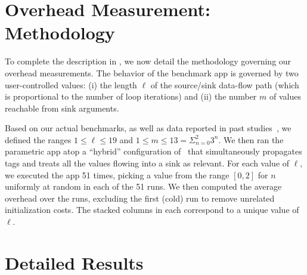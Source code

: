 \section{Overhead Measurement: Methodology}\label{Se:methodology}

To complete the description in , we now detail the methodology governing our overhead measurements.
The behavior of the benchmark app is governed by two user-controlled values: (i) the length $\ell$ of the source/sink data-flow path (which is proportional to the number of loop iterations) and (ii) the number $m$ of values reachable from sink arguments.

Based on our actual benchmarks, as well as data reported in past studies~\cite{TPFSW:PLDI09}, we defined the ranges $1 \leq \ell \leq 19$ and $1 \leq m \leq 13 = \Sigma_{n=0}^{2} 3^n$. We then ran the parametric app atop a ``hybrid'' configuration of \Tool\ that simultaneously propagates tags and treats all the values flowing into a sink as relevant.
%
For each value of $\ell$, we executed the app 51 times, picking a value from the range $[0,2]$ for $n$ uniformly at random in each of the 51 runs. We then computed the average overhead over the runs, excluding the first (cold) run to remove unrelated initialization costs. The stacked columns in  each correspond to a unique value of $\ell$.

\section{Detailed Results }\label{Se:completeRes}


